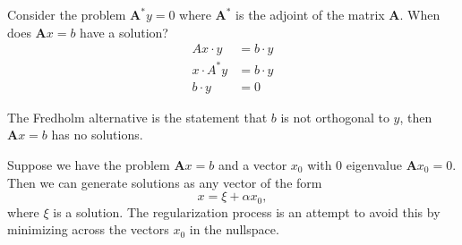 \documentclass[12pt]{article}
\renewcommand{\vec}[1]{\mathbf{#1}}
\theoremstyle{definition}
\theoremstyle{remark}
\numberwithin{equation}{section}
\begin{document}
Consider the problem $\vec{A}^*y = 0$ where $\vec{A}^*$ is the adjoint of the matrix $\vec{A}$. When does $\vec{A}x=b$ have a solution?
\begin{align}
  Ax \cdot y &= b \cdot y\\
  x\cdot A^*y &= b\cdot y \\
  b\cdot y &= 0
\end{align}

The Fredholm alternative is the statement that $b$ is not orthogonal to $y$, then $\vec{A}x=b$ has no solutions.

Suppose we have the problem $\vec{A}x=b$ and a vector $x_0$ with 0 eigenvalue $\vec{A}x_0 = 0$. Then we can generate solutions as any vector of the form
\begin{equation}
  x = \xi + \alpha x_0,
\end{equation}
where $\xi$ is a solution. The regularization process is an attempt to avoid this by minimizing across the vectors $x_0$ in the nullspace.
\end{document}
